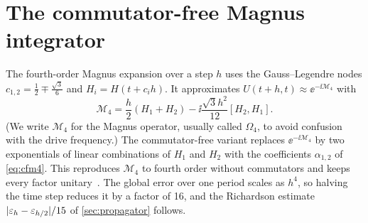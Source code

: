 \section{The commutator-free Magnus integrator}\label{app:cfm4}

The fourth-order Magnus expansion over a step $h$ uses the Gauss--Legendre nodes
$c_{1,2}=\tfrac12\mp\tfrac{\sqrt3}6$ and $H_i=H(t+c_ih)$. It approximates
$U(t+h,t)\approx\ee^{-\ii\mathcal M_4}$ with
\begin{equation}
  \mathcal M_4=\frac h2(H_1+H_2)-\ii\frac{\sqrt3h^2}{12}[H_2,H_1].
\end{equation}
(We write $\mathcal M_4$ for the Magnus operator, usually called $\Omega_4$, to avoid
confusion with the drive frequency.) The commutator-free variant replaces
$\ee^{-\ii\mathcal M_4}$ by two exponentials of linear combinations of $H_1$ and $H_2$ with
the coefficients $\alpha_{1,2}$ of \cref{eq:cfm4}. This reproduces $\mathcal M_4$ to fourth
order without commutators and keeps every factor unitary~\cite{blanes2006fourth,alvermann2011high}.
The global error over one period scales as $h^4$, so halving the time step reduces it by a
factor of 16, and the Richardson estimate $\lvert \varepsilon_h-\varepsilon_{h/2}\rvert/15$ of
\cref{sec:propagator} follows.

